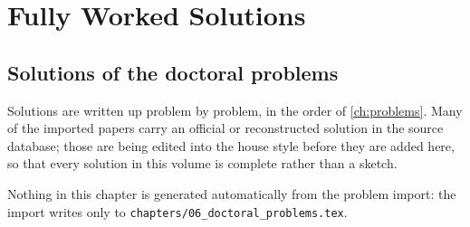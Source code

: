 \chapter{Fully Worked Solutions}
\label{ch:solutions}

\section{Solutions of the doctoral problems}

Solutions are written up problem by problem, in the order of
\cref{ch:problems}. Many of the imported papers carry an official or
reconstructed solution in the source database; those are being edited into the
house style before they are added here, so that every solution in this volume is
complete rather than a sketch.

Nothing in this chapter is generated automatically from the problem import: the
import writes only to \texttt{chapters/06\_doctoral\_problems.tex}.
